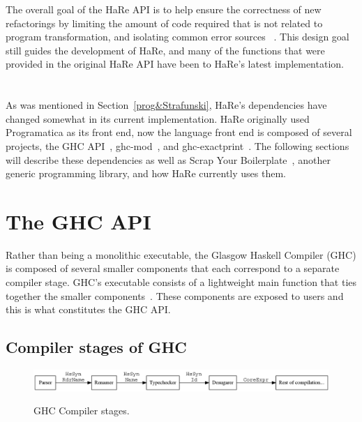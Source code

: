 The overall goal of the HaRe API is to help ensure the correctness of new refactorings by limiting the amount of code required that is not related to program transformation, and isolating common error sources \DIFaddbegin {}\DIFaddend ~\citep{hareApi}. This design goal still guides the development of HaRe, and many of the functions that were provided in the original HaRe API have been \DIFdelbegin {}\DIFdelend \DIFaddbegin {}\DIFaddend to HaRe's latest implementation.  

\DIFdelbegin \section{}
\addtocounter{section}{-1}%

\DIFdelend As was mentioned in Section~\ref{prog&Strafunski}, HaRe's dependencies have changed somewhat in its current implementation. HaRe originally used Programatica as its front end, now the language front end is composed of several projects\DIFdelbegin {}\DIFdelend , the GHC API~\citep{ghcApi}, ghc-mod~\citep{ghcMod}, and ghc-exactprint~\citep{exactprint}. The following sections will describe these dependencies as well as Scrap Your Boilerplate~\citep{syb}, another generic programming library, and how HaRe currently uses them.

\section{The GHC API}
\label{ghcApi}

Rather than being a monolithic executable, the Glasgow Haskell Compiler (GHC) is composed of several smaller components that each correspond to a separate compiler stage. GHC's executable consists of a lightweight main function that ties together the smaller components~\citep{ghcDesign}. These components are exposed to users  and this is what constitutes the GHC API.

\subsection{Compiler stages of GHC}\label{ghcStages}

\begin{figure}[t]
	\DIFdelbeginFL %
\DIFdelendFL \begin{center}
		\includegraphics[scale=.4]{graphVis/Chapter2/compilerStgs.png}
	\end{center}
	\caption{GHC Compiler stages.}
	\DIFaddbeginFL \label{compilerStages}
\DIFaddendFL \end{figure}

